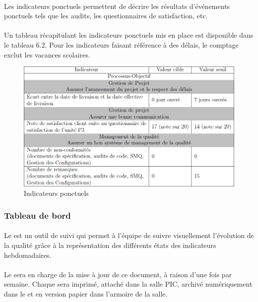\paragraph*{} Les indicateurs ponctuels permettent de décrire les résultats d’événements ponctuels tels que les audits, les questionnaires de satisfaction, etc.

\paragraph*{} Un tableau récapitulant les indicateurs ponctuels mis en place est disponible dans le tableau
6.2. Pour les indicateurs faisant référence à des délais, le comptage exclut les vacances scolaires.
\begin{figure}[h]
   \center
   \caption{\label{Tableau 6.2} Indicateurs ponctuels}
   \includegraphics[width=13cm]{./images/Indicateurs_ponctuels.jpg}
\end{figure}

\subsubsection*{Tableau de bord}
\label{Tableau de bord}

\paragraph*{} Le \TB{} est un outil de suivi qui permet à l'équipe \nomEquipe{} de suivre visuellement l'évolution de la qualité grâce à la représentation des différents états des indicateurs
hebdomadaires.

\paragraph*{} Le \RQ{} sera en charge de la mise à jour de ce document, à raison d'une
fois par semaine. Chaque \TB{} sera imprimé, attaché dans la salle PIC, archivé
numériquement dans le \DSQ{} et en version papier dans l'armoire de la salle.

